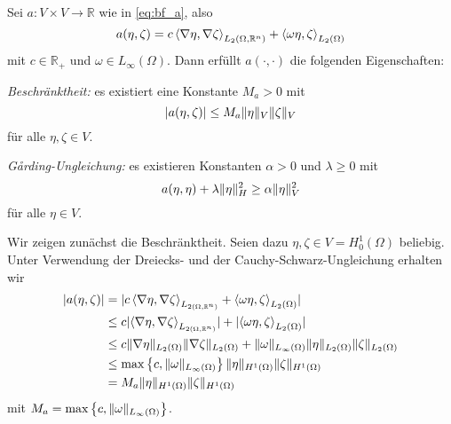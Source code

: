 \begin{Lemma}
    \label{lemma:a_bf_bounded_garding}
    Sei $a \colon V \times V \to \mathbb{R}$ wie in \eqref{eq:bf_a}, also
    \begin{equation}
        a(\eta, \zeta) = c \left\langle\nabla \eta,\nabla \zeta\right\rangle_{L_{2}(\Omega, \mathbb{R}^{n})} + \left\langle\omega \eta,\zeta\right\rangle_{L_{2}(\Omega)}
    \end{equation}
    mit $c \in \mathbb{R}_{+}$ und $\omega \in L_{\infty}(\Omega)$.
    Dann erfüllt $a(\cdot, \cdot)$ die folgenden Eigenschaften:
    \begin{thmenumerate}
        \item \emph{Beschränktheit:} es existiert eine Konstante $M_{a} > 0$ mit
        \begin{equation}
            \lvert a(\eta, \zeta)\rvert \leq M_{a} \lVert\eta\rVert_{V} \lVert\zeta\rVert_{V}
        \end{equation}
        für alle $\eta, \zeta \in V$.
        \label{lemma:a_bf_bounded_garding:1}
        \item \emph{G\aa{}rding-Ungleichung:} es existieren Konstanten $\alpha > 0$ und $\lambda \geq 0$ mit
        \begin{equation}
                a(\eta, \eta) + \lambda \lVert\eta\rVert_{H}^{2} \geq \alpha \lVert\eta\rVert_{V}^{2}
        \end{equation}
        für alle $\eta \in V$.
        \label{lemma:a_bf_bounded_garding:2}
    \end{thmenumerate}

    \begin{Beweis}
    Wir zeigen zunächst die Beschränktheit.
    Seien dazu $\eta, \zeta \in V = H^{1}_{0}(\Omega)$ beliebig.
    Unter Verwendung der Dreiecks- und der Cauchy-Schwarz-Ungleichung erhalten wir
    \begin{align}
        \lvert a(\eta, \zeta)\rvert
        &= \lvert c \left\langle\nabla \eta,\nabla \zeta\right\rangle_{L_{2(\Omega, \mathbb{R}^{n})}} + \left\langle\omega \eta,\zeta\right\rangle_{L_{2}(\Omega)}\rvert
        \\&\leq c \lvert\left\langle\nabla \eta,\nabla \zeta\right\rangle_{L_{2(\Omega, \mathbb{R}^{n})}}\rvert + \lvert\left\langle\omega \eta,\zeta\right\rangle_{L_{2}(\Omega)}\rvert
        \\&\leq c \lVert\nabla \eta\rVert_{L_{2}(\Omega)} \lVert\nabla \zeta\rVert_{L_{2}(\Omega)} + \lVert\omega\rVert_{L_{\infty}(\Omega)} \lVert\eta\rVert_{L_{2}(\Omega)} \lVert\zeta\rVert_{L_{2}(\Omega)}
        \\&\leq \max \left\{ c, \lVert\omega\rVert_{L_{\infty}(\Omega)} \right\} \lVert\eta\rVert_{H^{1}(\Omega)} \lVert\zeta\rVert_{H^{1}(\Omega)}
        \\&= M_{a} \lVert\eta\rVert_{H^{1}(\Omega)} \lVert\zeta\rVert_{H^{1}(\Omega)}
    \end{align}
    mit $M_{a} = \max \left\{ c, \lVert\omega\rVert_{L_{\infty}(\Omega)} \right\}$.


\end{Beweis}
\end{Lemma}
